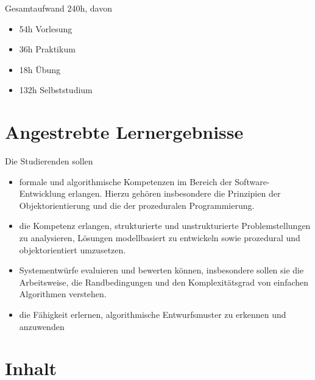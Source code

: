Gesamtaufwand 240h, davon

\begin{itemize}
\tightlist
\item
  54h Vorlesung
\item
  36h Praktikum
\item
  18h Übung
\item
  132h Selbststudium
\end{itemize}

\hypertarget{angestrebte-lernergebnissepathlabel....srcmodulbeschreibungen-bachelor-bpo5ba_algorithmenundprogrammierung1}{%
\section*{Angestrebte
Lernergebnisse\label{../../src/modulbeschreibungen-bachelor-bpo5/BA_AlgorithmenundProgrammierung1}}\label{angestrebte-lernergebnissepathlabel....srcmodulbeschreibungen-bachelor-bpo5ba_algorithmenundprogrammierung1}}

Die Studierenden sollen

\begin{itemize}
\tightlist
\item
  formale und algorithmische Kompetenzen im Bereich der
  Software-Entwicklung erlangen. Hierzu gehören insbesondere die
  Prinzipien der Objektorientierung und die der prozeduralen
  Programmierung.
\item
  die Kompetenz erlangen, strukturierte und unstrukturierte
  Problemstellungen zu analysieren, Lösungen modellbasiert zu entwickeln
  sowie prozedural und objektorientiert umzusetzen.
\item
  Systementwürfe evaluieren und bewerten können, insbesondere sollen sie
  die Arbeitsweise, die Randbedingungen und den Komplexitätsgrad von
  einfachen Algorithmen verstehen.
\item
  die Fähigkeit erlernen, algorithmische Entwurfsmuster zu erkennen und
  anzuwenden
\end{itemize}

\hypertarget{inhaltpathlabel....srcmodulbeschreibungen-bachelor-bpo5ba_algorithmenundprogrammierung1}{%
\section*{Inhalt\label{../../src/modulbeschreibungen-bachelor-bpo5/BA_AlgorithmenundProgrammierung1}}\label{inhaltpathlabel....srcmodulbeschreibungen-bachelor-bpo5ba_algorithmenundprogrammierung1}}

